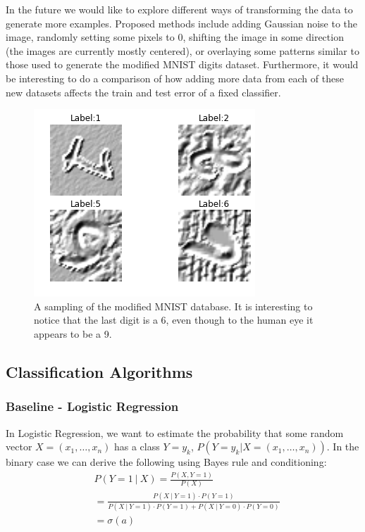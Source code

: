 \documentclass[conference]{IEEEtran}
\begin{document}
In the future we would like to explore different ways of transforming the data to generate more examples. Proposed methods include adding Gaussian noise to the image, randomly setting some pixels to 0, shifting the image in some direction (the images are currently mostly centered), or overlaying some patterns similar to those used to generate the modified MNIST digits dataset. Furthermore, it would be interesting to do a comparison of how adding more data from each of these new datasets affects the train and test error of a fixed classifier. 

\begin{figure}[h]
	\centering
	\includegraphics[scale=0.40]{sample_of_images.png}
	\caption{A sampling of the modified MNIST database. It is interesting to notice that the last digit is a 6, even though to the human eye it appears to be a 9.}
	\label{MNISTSample}
\end{figure}

\subsection{Classification Algorithms}

\subsubsection{Baseline - Logistic Regression}
In Logistic Regression, we want to estimate the probability that some random vector $X=(x_1, \ldots, x_n)$ has a class $Y=y_k$, $P(Y=y_k | X=(x_1, \ldots, x_n))$. In the binary case we can derive the following using Bayes rule and conditioning:
\begin{equation*}
\begin{split}
&P(Y=1~|~X) = \frac{P(X, Y=1)}{P(X)}\\
&= \frac{ P(X~|~Y=1)\cdot P(Y=1) }{ P(X~|~Y=1)\cdot P(Y=1) + P(X~|~Y=0)\cdot P(Y=0) }\\
& = \sigma(a)\\
\end{split}
\end{equation*}
\end{document}
